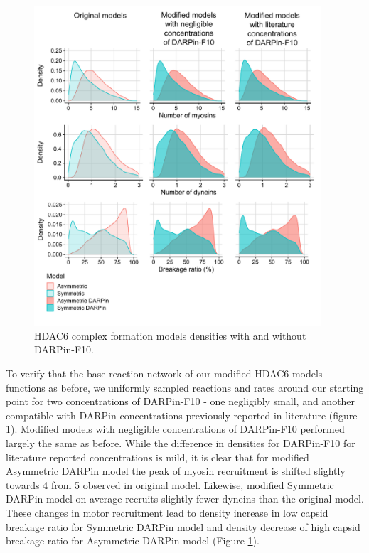 \begin{figure}
\begin{center}
\includegraphics[width=0.95\textwidth, trim={0cm 0cm 0cm 0cm}, clip]{D_chapters/3_DARPinModels/Density_DARPin.pdf}
\caption[HDAC6 complex formation models densities with and without DARPin-F10]%
{HDAC6 complex formation models densities with and without DARPin-F10.}
\label{figure:darpinDensities}
\end{center}
\end{figure}

To verify that the base reaction network of our modified HDAC6 models functions as before, we uniformly sampled reactions and rates around our starting point for two concentrations of DARPin-F10 - one negligibly small, and another compatible with DARPin concentrations previously reported in literature (figure \ref{figure:darpinDensities}). Modified models with negligible concentrations of DARPin-F10 performed largely the same as before. While the difference in densities for DARPin-F10 for literature reported concentrations is mild, it is clear that for modified Asymmetric DARPin model the peak of myosin recruitment is shifted slightly towards 4 from 5 observed in original model. Likewise, modified Symmetric DARPin model on average recruits slightly fewer dyneins than the original model. These changes in motor recruitment lead to density increase in low capsid breakage ratio for Symmetric DARPin model and density decrease of high capsid breakage ratio for Asymmetric DARPin model (Figure \ref{figure:darpinDensities}).

